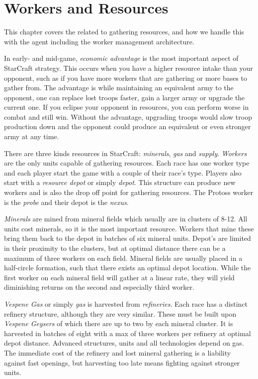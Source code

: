 \chapter{Workers and Resources}
\label{ch:resources}
This chapter covers the related to gathering resources, and how we handle this with the agent including the worker management architecture. 

In early- and mid-game, \emph{economic advantage} is the most important aspect of StarCraft strategy. This occurs when you have a higher resource intake than your opponent, such as if you have more workers that are gathering or more bases to gather from. The advantage is while maintaining an equivalent army to the opponent, one can replace lost troops faster, gain a larger army or upgrade the current one. If you eclipse your opponent in resources, you can perform worse in combat and still win. Without the advantage, upgrading troops would slow troop production down and the opponent could produce an equivalent or even stronger army at any time.

There are three kinds resources in StarCraft: \emph{minerals}, \emph{gas} and \emph{supply}. \emph{Workers} are the only units capable of gathering resources. Each race has one worker type and each player start the game with a couple of their race's type. Players also start with a \emph{resource depot} or simply \emph{depot}. This structure can produce new workers and is also the drop off point for gathering resources. The Protoss worker is the \emph{probe} and their depot is the \emph{nexus}.

\emph{Minerals} are mined from mineral fields which usually are in clusters of 8-12. All units cost minerals, so it is the most important resource. Workers that mine these bring them back to the depot in batches of six mineral units. Depot's are limited in their proximity to the clusters, but at optimal distance there can be a maximum of three workers on each field. Mineral fields are usually placed in a half-circle formation, such that there exists an optimal depot location. While the first worker on each mineral field will gather at a linear rate, they will yield diminishing returns on the second and especially third worker.

\emph{Vespene Gas} or simply \emph{gas} is harvested from \emph{refineries}. Each race has a distinct refinery structure, although they are very similar. These must be built upon \emph{Vespene Geysers} of which there are up to two by each mineral cluster. It is harvested in batches of eight with a max of three workers per refinery at optimal depot distance. Advanced structures, units and all technologies depend on gas. The immediate cost of the refinery and lost mineral gathering is a liability against fast openings, but harvesting too late means fighting against stronger units.

